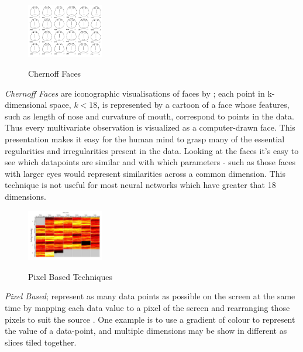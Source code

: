 \documentclass[a4paper,11pt,titlepage]{article}
\begin{document}
 	\begin{figure}[H]
    			\centering	
			{{\includegraphics[width=0.3\textwidth]
    				{img/chernoff_faces} 
    			}}%
    			\caption{Chernoff Faces}%
    		\label{fig:lascaux}
	\end{figure}
 		
		 \textit{Chernoff Faces} are iconographic visualisations of faces by \cite{Chernoff1973}; each point in k-dimensional space, $ k < 18 $, is represented by a cartoon of a face whose features, such as length of nose and curvature of mouth, correspond to points in the data. Thus every multivariate observation is visualized as a computer-drawn face. This presentation makes it easy for the human mind to grasp many of the essential regularities and irregularities present in the data. Looking at the faces it's easy to see which datapoints are similar and with which parameters - such as those faces with larger eyes would represent similarities across a common dimension. This technique is not useful for most neural networks which have greater that 18 dimensions.
		 \par
 		
 	\begin{figure}[H]
    			\centering	
			{{\includegraphics[width=0.3\textwidth]
    				{img/kiem_pixel_two} 
    			}}%
    			\caption{Pixel Based Techniques}%
    		\label{fig:lascaux}
	\end{figure}	
 		
		\textit{Pixel Based}; represent as many data points as possible on the screen at the same time by mapping each data value to a pixel of the screen and rearranging those pixels to suit the source \cite{Keim2000}. One example is to use a gradient of colour to represent the value of a data-point, and multiple dimensions may be show in different as slices tiled together.
		\par 
		 		
\end{document}
